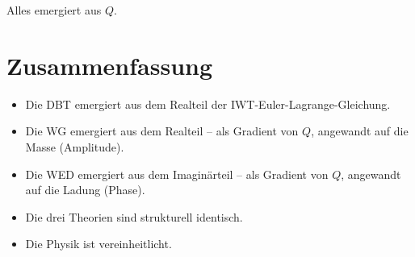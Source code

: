 Alles emergiert aus \( Q \).

\section{Zusammenfassung}

\begin{itemize}
\item Die DBT emergiert aus dem Realteil der IWT-Euler-Lagrange-Gleichung.
\item Die WG emergiert aus dem Realteil – als Gradient von \( Q \), angewandt auf die Masse (Amplitude).
\item Die WED emergiert aus dem Imaginärteil – als Gradient von \( Q \), angewandt auf die Ladung (Phase).
\item Die drei Theorien sind strukturell identisch.
\item Die Physik ist vereinheitlicht.
\end{itemize}
